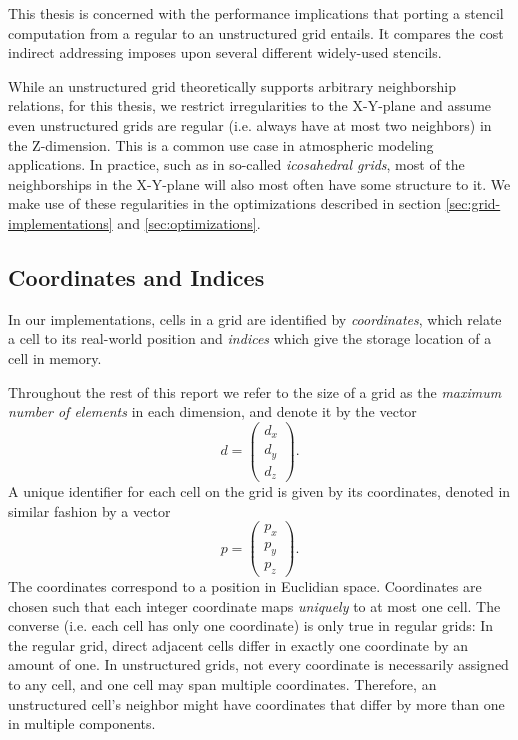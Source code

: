This thesis is concerned with the performance implications that porting a stencil computation from a regular to an unstructured grid entails. It compares the cost indirect addressing imposes upon several different widely-used stencils.

While an unstructured grid theoretically supports arbitrary neighborship relations, for this thesis, we restrict irregularities to the X-Y-plane and assume even unstructured grids are regular (i.e. always have at most two neighbors) in the Z-dimension. This is a common use case in atmospheric modeling applications. In practice, such as in so-called \emph{icosahedral grids}, most of the neighborships in the X-Y-plane will also most often have some structure to it. We make use of these regularities in the optimizations described in section \ref{sec:grid-implementations} and \ref{sec:optimizations}.


\subsection{Coordinates and Indices}

In our implementations, cells in a grid are identified by \emph{coordinates}, which relate a cell to its real-world position and \emph{indices} which give the storage location of a cell in memory. 

Throughout the rest of this report we refer to the size of a grid as the \emph{maximum number of elements} in each dimension, and denote it by the vector
$$d = \begin{pmatrix}d_x \\ d_y \\ d_z\end{pmatrix}.$$
A unique identifier for each cell on the grid is given by its coordinates, denoted in similar fashion by a vector
$$p = \begin{pmatrix}p_x \\ p_y \\ p_z\end{pmatrix}.$$
The coordinates correspond to a position in Euclidian space. Coordinates are chosen such that each integer coordinate maps \emph{uniquely} to at most one cell. The converse (i.e. each cell has only one coordinate) is only true in regular grids: In the regular grid, direct adjacent cells differ in exactly one coordinate by an amount of one. In unstructured grids, not every coordinate is necessarily assigned to any cell, and one cell may span multiple coordinates. Therefore, an unstructured cell's neighbor might have coordinates that differ by more than one in multiple components.

